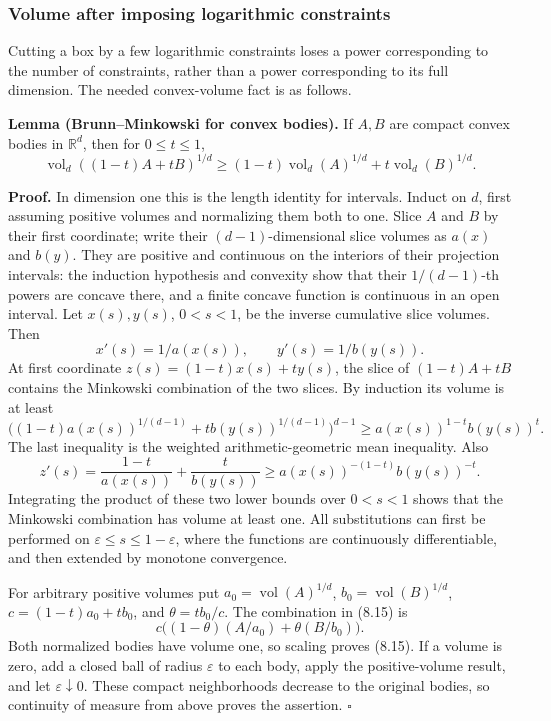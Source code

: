 \documentclass[
  11pt,
  a4paper,
]{article}
\begin{document}
\subsubsection{Volume after imposing logarithmic
constraints}\label{volume-after-imposing-logarithmic-constraints}

Cutting a box by a few logarithmic constraints loses a power
corresponding to the number of constraints, rather than a power
corresponding to its full dimension. The needed convex-volume fact is as
follows.

\textbf{Lemma (Brunn--Minkowski for convex bodies).} If \(A,B\) are
compact convex bodies in \(\mathbb R^d\), then for \(0\le t\le1\), \[
\operatorname{vol}_d((1-t)A+tB)^{1/d}
\ge(1-t)\operatorname{vol}_d(A)^{1/d}
+t\operatorname{vol}_d(B)^{1/d}.
\tag{8.15}
\]

\textbf{Proof.} In dimension one this is the length identity for
intervals. Induct on \(d\), first assuming positive volumes and
normalizing them both to one. Slice \(A\) and \(B\) by their first
coordinate; write their \((d-1)\)-dimensional slice volumes as \(a(x)\)
and \(b(y)\). They are positive and continuous on the interiors of their
projection intervals: the induction hypothesis and convexity show that
their \(1/(d-1)\)-th powers are concave there, and a finite concave
function is continuous in an open interval. Let \(x(s),y(s)\),
\(0<s<1\), be the inverse cumulative slice volumes. Then \[
x'(s)=1/a(x(s)),\qquad y'(s)=1/b(y(s)).
\] At first coordinate \(z(s)=(1-t)x(s)+t y(s)\), the slice of
\((1-t)A+tB\) contains the Minkowski combination of the two slices. By
induction its volume is at least \[
\big((1-t)a(x(s))^{1/(d-1)}
+t b(y(s))^{1/(d-1)}\big)^{d-1}
\ge a(x(s))^{1-t}b(y(s))^t.
\] The last inequality is the weighted arithmetic-geometric mean
inequality. Also \[
z'(s)=\frac{1-t}{a(x(s))}+\frac{t}{b(y(s))}
\ge a(x(s))^{-(1-t)}b(y(s))^{-t}.
\] Integrating the product of these two lower bounds over \(0<s<1\)
shows that the Minkowski combination has volume at least one. All
substitutions can first be performed on
\(\varepsilon\le s\le1-\varepsilon\), where the functions are
continuously differentiable, and then extended by monotone convergence.

For arbitrary positive volumes put \(a_0=\operatorname{vol}(A)^{1/d}\),
\(b_0=\operatorname{vol}(B)^{1/d}\), \(c=(1-t)a_0+t b_0\), and
\(\theta=t b_0/c\). The combination in (8.15) is \[
c\big((1-\theta)(A/a_0)+\theta(B/b_0)\big).
\] Both normalized bodies have volume one, so scaling proves (8.15). If
a volume is zero, add a closed ball of radius \(\varepsilon\) to each
body, apply the positive-volume result, and let
\(\varepsilon\downarrow0\). These compact neighborhoods decrease to the
original bodies, so continuity of measure from above proves the
assertion. \(\square\)
\end{document}
